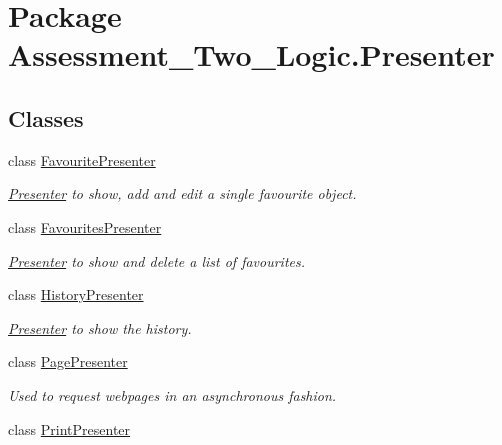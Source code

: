 \hypertarget{namespace_assessment___two___logic_1_1_presenter}{
\section{Package Assessment\_\-Two\_\-Logic.Presenter}
\label{namespace_assessment___two___logic_1_1_presenter}
}
\subsection*{Classes}
\begin{DoxyCompactItemize}
\item 
class \hyperlink{class_assessment___two___logic_1_1_presenter_1_1_favourite_presenter}{FavouritePresenter}
\begin{DoxyCompactList}\small\item\em \hyperlink{namespace_assessment___two___logic_1_1_presenter}{Presenter} to show, add and edit a single favourite object. \item\end{DoxyCompactList}\item 
class \hyperlink{class_assessment___two___logic_1_1_presenter_1_1_favourites_presenter}{FavouritesPresenter}
\begin{DoxyCompactList}\small\item\em \hyperlink{namespace_assessment___two___logic_1_1_presenter}{Presenter} to show and delete a list of favourites. \item\end{DoxyCompactList}\item 
class \hyperlink{class_assessment___two___logic_1_1_presenter_1_1_history_presenter}{HistoryPresenter}
\begin{DoxyCompactList}\small\item\em \hyperlink{namespace_assessment___two___logic_1_1_presenter}{Presenter} to show the history. \item\end{DoxyCompactList}\item 
class \hyperlink{class_assessment___two___logic_1_1_presenter_1_1_page_presenter}{PagePresenter}
\begin{DoxyCompactList}\small\item\em Used to request webpages in an asynchronous fashion. \item\end{DoxyCompactList}\item 
class \hyperlink{class_assessment___two___logic_1_1_presenter_1_1_print_presenter}{PrintPresenter}
\end{DoxyCompactItemize}
